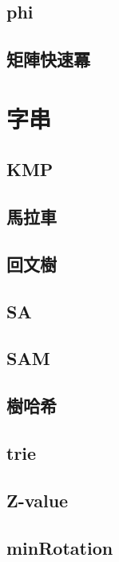 \documentclass[a4paper,10pt,twocolumn,oneside]{article}
\begin{document}
\subsection{phi}

\subsection{矩陣快速冪}

\section{字串}
\subsection{KMP}

\subsection{馬拉車}

\subsection{回文樹}

\subsection{SA}

\subsection{SAM}

\subsection{樹哈希}

\subsection{trie}

\subsection{Z-value}

\subsection{minRotation}

\end{document}
